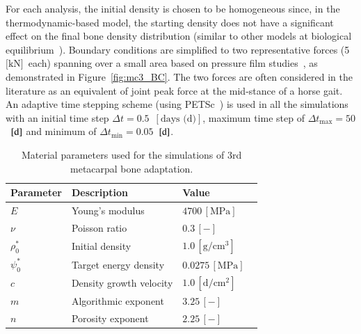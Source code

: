 \documentclass[review]{elsarticle}
\numberwithin{equation}{section}
\begin{document}
For each analysis, the initial density is chosen to be homogeneous since, in the thermodynamic-based model, the starting density does not have a significant effect on the final bone density distribution (similar to other models at biological equilibrium~\citep{kuhl2003theory}). %
Boundary conditions are simplified to two representative forces (5~$\text{[kN]}$~each) spanning over a small area based on pressure film studies~\citep{Brama2001}, as demonstrated in Figure~\ref{fig:mc3_BC}. 
The two forces are often considered in the literature as an equivalent of joint peak force at the mid-stance of a horse gait. %
An adaptive time stepping scheme (using PETSc~\citep{petsc-web}) is used in all the simulations with an initial time step $\Delta t = 0.5$~$[\text{days (d)}]$, maximum time step of $\Delta t_{\text{max}} = 50$~$[\text d]$ and minimum of $\Delta t_{\text {min}} = 0.05$~$[\text d]$.
\begin{table}[h]
	\centering
	\begin{tabular}{lll}
		\hline
		Parameter             & Description                  & Value  \\ \hline
		$E  $                 & Young's modulus              & $4700 \,\mathrm{ [MPa]}$ ~\citep{Les1994} \\
		$\nu  $               & Poisson ratio                & $0.3 \,\mathrm{ [-]}$ \\
		$\rho_0 ^\ast  $      & Initial density              & $1.0 \,\mathrm{[ g/cm^{3}]}$  \\
		$\psi_{0}^\ast $      & Target energy density        & $0.0275\,\mathrm{ [MPa]}$  ~\citep{Waffenschmidt2012}  \\
		$c$                   & Density growth velocity      & $1.0 \,\mathrm{ [d/cm^{2}]}$   \\
		$m$                   & Algorithmic exponent         & $ 3.25 \,\mathrm{ [-]}$          \\
		$n$                   & Porosity exponent            & $2.25 \,\mathrm{ [-]}$     ~\citep{Les1994}   \\ 
		\hline
	\end{tabular} 
	\caption{Material parameters used for the simulations of 3rd metacarpal bone adaptation.}
	\label{tab:parameters_mc3}
\end{table}
\end{document}
